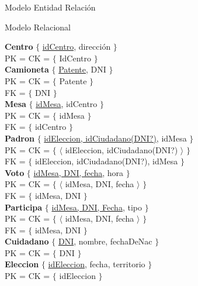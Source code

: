 \begin{section}{Modelo Entidad Relaci\'on}

\begin{subsection}{Modelo Relacional}

\textbf{Centro} $\lbrace$ \underline{idCentro}, direcci\'on $\rbrace$\\
PK = CK = $ \lbrace $ IdCentro $ \rbrace $ \\

\textbf{Camioneta} $ \lbrace $ \underline{Patente}, DNI $ \rbrace $\\
PK = CK = $ \lbrace $ Patente $ \rbrace $\\
FK = $ \lbrace $ DNI $ \rbrace $\\

\textbf{Mesa} $ \lbrace $ \underline{idMesa}, idCentro $ \rbrace $\\
PK = CK = $ \lbrace $ idMesa $ \rbrace $\\
FK = $ \lbrace $ idCentro $ \rbrace $\\

\textbf{Padron} $ \lbrace $ \underline{idEleccion, idCiudadano(DNI?)}, idMesa $ \rbrace $\\
PK = CK = $ \lbrace $ $ \langle $ idEleccion, idCiudadano(DNI?) $ \rangle $ $ \rbrace $\\
FK = $ \lbrace $ idEleccion, idCiudadano(DNI?), idMesa $ \rbrace $\\

\textbf{Voto} $ \lbrace $ \underline{idMesa, DNI, fecha}, hora $ \rbrace $ \\
PK = CK = $ \lbrace $ $ \langle $ idMesa, DNI, fecha $ \rangle $ $ \rbrace $ \\
FK = $ \lbrace $ idMesa, DNI $ \rbrace $\\

\textbf{Participa} $ \lbrace $ \underline{idMesa, DNI, Fecha}, tipo $ \rbrace $ \\
PK = CK = $ \lbrace $ $ \langle $ idMesa, DNI, fecha $ \rangle $ $ \rbrace $ \\
FK = $ \lbrace $ idMesa, DNI $ \rbrace $\\

\textbf{Cuidadano} $ \lbrace $ \underline{DNI}, nombre, fechaDeNac $ \rbrace $ \\
PK = CK = $ \lbrace $ DNI $ \rbrace $ \\

\textbf{Eleccion} $ \lbrace $ \underline{idEleccion}, fecha, territorio $ \rbrace $ \\
PK = CK = $ \lbrace $ idEleccion $ \rbrace $ \\

\end{subsection}

\end{section}
